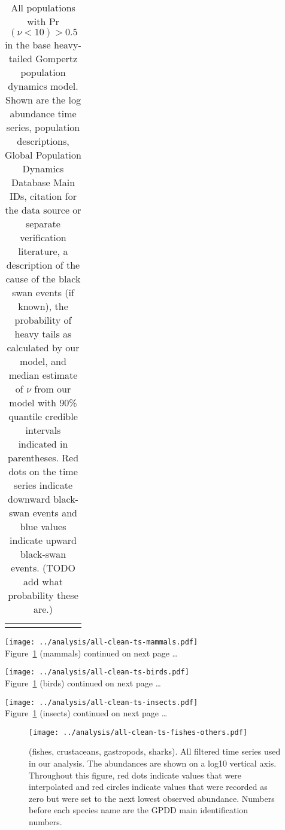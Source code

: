 \singlespacing
\begin{footnotesize}
\begin{longtable}{>{\RaggedRight}m{1.5cm}>{\RaggedRight}p{4.3cm}>{\RaggedRight}p{0.8cm}>{\RaggedRight}p{1.7cm}>{\RaggedRight}p{1.0cm}>{\RaggedRight}p{3.0cm}>{\RaggedRight}p{1.7cm}>{\RaggedRight}p{1.3cm}}
\caption{All populations with Pr$(\nu < 10) > 0.5$ in the base heavy-tailed Gompertz population dynamics model. Shown are the log abundance time series, population descriptions, Global Population Dynamics Database Main IDs, citation for the data source or separate verification literature, a description of the cause of the black swan events (if known), the probability of heavy tails as calculated by our model, and median estimate of $\nu$ from our model with 90\% quantile credible intervals indicated in parentheses. Red dots on the time series indicate downward black-swan events and blue values indicate upward black-swan events. (TODO add what probability these are.)}\\
\toprule

\label{tab:causes-supp}
\end{longtable}
\end{footnotesize}
\onehalfspacing


\renewcommand{\thefigure}{S\arabic{figure}}
\setcounter{figure}{0}

\begin{centering}
\clearpage
\texttt{[image: ../analysis/all-clean-ts-mammals.pdf]}\\
Figure~\ref{fig:all-ts} (mammals) continued on next page \ldots

\clearpage
\texttt{[image: ../analysis/all-clean-ts-birds.pdf]}\\
Figure~\ref{fig:all-ts} (birds) continued on next page \ldots

\clearpage
\texttt{[image: ../analysis/all-clean-ts-insects.pdf]}\\
Figure~\ref{fig:all-ts} (insects) continued on next page \ldots

\end{centering}

\begin{figure}[htbp]
\begin{center}
\texttt{[image: ../analysis/all-clean-ts-fishes-others.pdf]}
\caption{
  (fishes, crustaceans, gastropods, sharks). All filtered time series used in our analysis. The abundances are shown on a log10 vertical axis. Throughout this figure, red dots indicate values that were interpolated and red circles indicate values that were recorded as zero but were set to the next lowest observed abundance. Numbers before each species name are the GPDD main identification numbers.
}
\label{fig:all-ts}
\end{center}
\end{figure}

